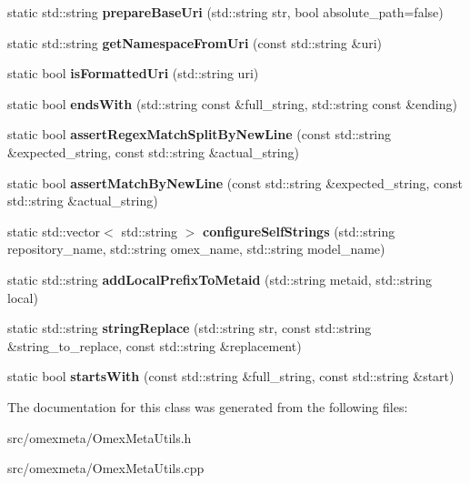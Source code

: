 \begin{DoxyCompactItemize}
static std\+::string {\bfseries prepare\+Base\+Uri} (std\+::string str, bool absolute\+\_\+path=false)
\item 
\mbox{\label{classomexmeta_1_1OmexMetaUtils_a0956bde073b212596d8e4b2ffc983e47}} 
static std\+::string {\bfseries get\+Namespace\+From\+Uri} (const std\+::string \&uri)
\item 
\mbox{\label{classomexmeta_1_1OmexMetaUtils_af663724f2efb0324a64c6a57e8491c13}} 
static bool {\bfseries is\+Formatted\+Uri} (std\+::string uri)
\item 
\mbox{\label{classomexmeta_1_1OmexMetaUtils_a9c2b712b85f74fff9740477660f7b371}} 
static bool {\bfseries ends\+With} (std\+::string const \&full\+\_\+string, std\+::string const \&ending)
\item 
\mbox{\label{classomexmeta_1_1OmexMetaUtils_a4ec81c80bf33d232331ea9ef0b94da61}} 
static bool {\bfseries assert\+Regex\+Match\+Split\+By\+New\+Line} (const std\+::string \&expected\+\_\+string, const std\+::string \&actual\+\_\+string)
\item 
\mbox{\label{classomexmeta_1_1OmexMetaUtils_a6ddc16d56f238ef7ff3c8ab355163ef7}} 
static bool {\bfseries assert\+Match\+By\+New\+Line} (const std\+::string \&expected\+\_\+string, const std\+::string \&actual\+\_\+string)
\item 
\mbox{\label{classomexmeta_1_1OmexMetaUtils_a0b5fd1b4237e1534f2339349efa1dd7a}} 
static std\+::vector$<$ std\+::string $>$ {\bfseries configure\+Self\+Strings} (std\+::string repository\+\_\+name, std\+::string omex\+\_\+name, std\+::string model\+\_\+name)
\item 
\mbox{\label{classomexmeta_1_1OmexMetaUtils_ade5e8d004b8f61618815a854d905a506}} 
static std\+::string {\bfseries add\+Local\+Prefix\+To\+Metaid} (std\+::string metaid, std\+::string local)
\item 
\mbox{\label{classomexmeta_1_1OmexMetaUtils_aca2230ca99338b9dc0fc7d296b0c553b}} 
static std\+::string {\bfseries string\+Replace} (std\+::string str, const std\+::string \&string\+\_\+to\+\_\+replace, const std\+::string \&replacement)
\item 
\mbox{\label{classomexmeta_1_1OmexMetaUtils_a66d58e0ebcbee1857b23ead70c87de7f}} 
static bool {\bfseries starts\+With} (const std\+::string \&full\+\_\+string, const std\+::string \&start)
\end{DoxyCompactItemize}


The documentation for this class was generated from the following files\+:\begin{DoxyCompactItemize}
\item 
src/omexmeta/Omex\+Meta\+Utils.\+h\item 
src/omexmeta/Omex\+Meta\+Utils.\+cpp\end{DoxyCompactItemize}
